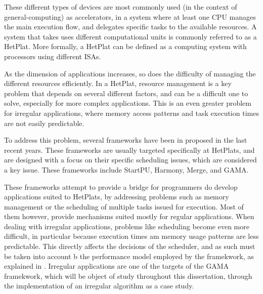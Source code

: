 \documentclass[main.tex]{subfiles}
\begin{document}
These different types of devices are most commonly used (in the context of general-computing) as accelerators, in a system where at least one \ac{CPU} manages the main execution flow, and delegates specific tasks to the available resources. A system that takes uses different computational units is commonly referred to as a \ac{HetPlat}. More formally, a \ac{HetPlat} can be defined as a computing system with processors using different \acp{ISA}.

As the dimension of applications increases, so does the difficulty of managing the different resources efficiently. In a \ac{HetPlat}, resource management is a key problem that depends on several different factors, and can be a difficult one to solve, especially for more complex applications. This is an even greater problem for irregular applications, where memory access patterns and task execution times are not easily predictable.

To address this problem, several frameworks have been in proposed in the last recent years. These frameworks are usually targeted specifically at \acp{HetPlat}, and are designed with a focus on their specific scheduling issues, which are considered a key issue. These frameworks include StartPU, Harmony, Merge, and GAMA.  

These frameworks attempt to provide a bridge for programmers do develop applications suited to \acp{HetPlat}, by addressing problems such as memory management or the scheduling of multiple tasks issued for execution. Most of them however, provide mechanisms suited mostly for regular applications. When dealing with irregular applications, problems like scheduling become even more difficult, in particular because execution times am memory usage patterns are less predictable. This directly affects the decisions of the scheduler, and as such must be taken into account b the performance model employed by the framekwork, as explained in . Irregular applications are one of the targets of the \ac{GAMA} framekwork, which will be object of study throughout this dissertation, through the implementation of an irregular algorithm as a case study.
\end{document}
